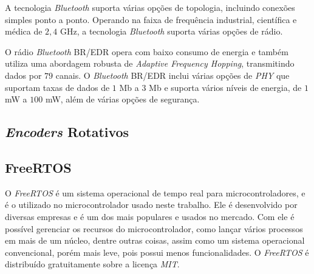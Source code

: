 A  tecnologia \emph{Bluetooth}  suporta várias opções de topologia, incluindo conexões simples ponto a ponto. Operando na faixa de frequência industrial, científica e médica de $2,4$ GHz, a tecnologia \emph{Bluetooth} suporta várias opções de rádio.
    
O rádio \emph{Bluetooth} BR/EDR opera com baixo consumo de energia e também utiliza uma abordagem robusta de \textit{Adaptive Frequency Hopping}, transmitindo dados por $79$ canais. O \textit{Bluetooth} BR/EDR inclui várias opções de \textit{PHY} que suportam taxas de dados de $1$ Mb a $3$ Mb e suporta vários níveis de energia, de $1$mW a $100$ mW, além de várias opções de segurança.


\subsection{\textit{Encoders} Rotativos}


\subsection{FreeRTOS}
O \emph{FreeRTOS} é um sistema operacional de tempo real para microcontroladores, e é o utilizado no microcontrolador usado neste trabalho. Ele é desenvolvido por diversas empresas e é um dos mais populares e usados no mercado. Com ele é possível gerenciar os recursos do microcontrolador, como lançar vários processos em mais de um núcleo, dentre outras coisas, assim como um sistema operacional convencional, porém mais leve, pois possui menos funcionalidades. O \emph{FreeRTOS} é distribuído gratuitamente sobre a licença \textit{MIT}.

